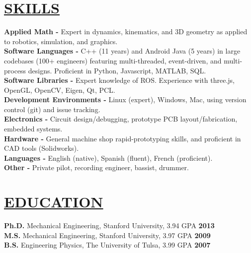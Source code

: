 \documentclass[line,margin]{res}
\begin{document}
\begin{resume}
\section{\underline{SKILLS}}
\vspace{1.0pc}
\textbf{Applied Math -}
Expert in dynamics, kinematics, and 3D geometry as applied to robotics, simulation, and graphics.
\\[0.0pc]
\textbf{Software Languages -}
C++ (11 years) and Android Java (5 years) in large codebases (100+ engineers) featuring multi-threaded, event-driven, and multi-process designs. Proficient in Python, Javascript, MATLAB, SQL.
\\[0.0pc]
\textbf{Software Libraries -}
Expert knowledge of ROS. Experience with three.js, OpenGL, OpenCV, Eigen, Qt, PCL.
\\[0.0pc]
\textbf{Development Environments -}
Linux (expert), Windows, Mac, using version control (git) and issue tracking.
\\[0.0pc]
\textbf{Electronics -}
Circuit design/debugging, prototype PCB layout/fabrication, embedded systems.
\\[0.0pc]
\textbf{Hardware -}
General machine shop rapid-prototyping skills, and proficient in CAD tools (Solidworks).
\\[0.0pc]\textbf{Languages -} English (native), Spanish (fluent), French (proficient).
\\[0.0pc]\textbf{Other -} Private pilot, recording engineer, bassist, drummer.
%
%
\section{\underline{EDUCATION}}
\vspace{1.0pc}
\textbf{Ph.D.} Mechanical Engineering, Stanford University, 3.94 GPA
\hfill \textbf{2013}%
%
\\[0.0pc]\textbf{M.S.} Mechanical Engineering, Stanford University, 3.97 GPA \hfill  \textbf{2009}
\\[0.0pc]\textbf{B.S.} Engineering Physics, The University of Tulsa, 3.99 GPA \hfill \textbf{2007}
%


\end{resume}
\end{document}
